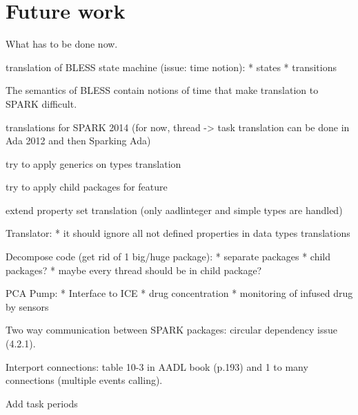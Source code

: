 
\cleardoublepage

\chapter{Future work}
\label{future_work}

What has to be done now.

translation of BLESS state machine (issue: time notion):
	* states
	* transitions

The semantics of BLESS contain notions of time that make translation to SPARK difficult.

translations for SPARK 2014 (for now, thread -> task translation can be done in Ada 2012 and then Sparking Ada)

try to apply generics on types translation

try to apply child packages for feature 

extend property set translation (only aadlinteger and simple types are handled)

Translator:
* it should ignore all not defined properties in data types translations

Decompose code (get rid of 1 big/huge package):
* separate packages
* child packages?
* maybe every thread should be in child package?

PCA Pump:
* Interface to ICE
* drug concentration
* monitoring of infused drug by sensors

Two way communication between SPARK packages: circular dependency issue (4.2.1).

Interport connections: table 10-3 in AADL book (p.193) and 1 to many connections (multiple events calling).

Add task periods